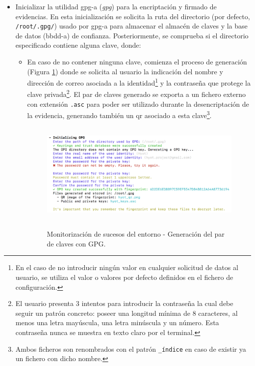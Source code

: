 \documentclass[12pt,a4paper, twoside]{report}
\begin{document}
\begin{itemize}
	 	\item Inicializar la utilidad \gls{gpg-a} (\textit{\gls{gpg}}) para la encriptación y firmado de evidencias. En esta inicialización se solicita la ruta del directorio (por defecto, \texttt{/root/.gpg/}) usado por \gls{gpg-a} para almacenar el almacén de claves y la base de datos (\gls{bbdd-a}) de confianza. Posteriormente, se comprueba si el directorio especificado contiene alguna clave, donde:
	 		\begin{itemize}
	 			\item En caso de no contener ninguna clave, comienza el proceso de generación (Figura \ref{fig:userguide_monitoring_gpg}) donde se solicita al usuario la indicación del nombre y dirección de correo asociada a la identidad\footnote{En el caso de no introducir ningún valor en cualquier solicitud de datos al usuario, se utiliza el valor o valores por defecto definidos en el fichero de configuración.} y la contraseña que protege la clave privada\footnote{El usuario presenta 3 intentos para introducir la contraseña la cual debe seguir un patrón concreto: poseer una longitud mínima de 8 caracteres, al menos una letra mayúscula, una letra minúscula y un número. Esta contraseña nunca se muestra en texto claro por el terminal.}. El par de claves generado se exporta a un fichero externo con extensión \texttt{.asc} para poder ser utilizado durante la desencriptación de la evidencia, generando también un \gls{qr} asociado a esta clave\footnote{Ambos ficheros son renombrados con el patrón  \texttt{\_índice} en caso de existir ya un fichero con dicho nombre.}.
	 		\newpage
	 			
	 		\begin{figure}[!ht]   
				\caption{Monitorización de sucesos del entorno - Generación del par de claves con GPG.} 
				\begin{center} 
					\includegraphics[width=14cm,height=5cm]{Images/userGuide/monitoring/gpg} \\
					\label{fig:userguide_monitoring_gpg} 
				\end{center}  
			\end{figure}
	 			

\end{itemize}
\end{itemize}
\end{document}
